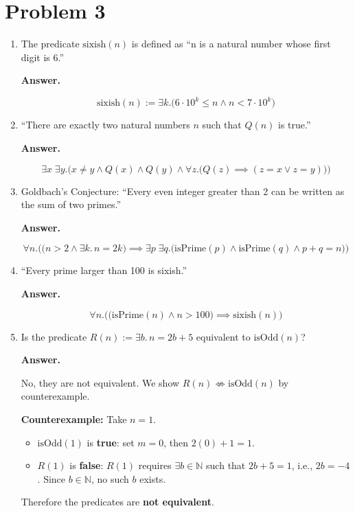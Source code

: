 \documentclass[11pt]{article}
\newcommand{\answer}{
    \vspace{0.5em}
    \noindent\textbf{Answer.}
}
\begin{document}
\section*{Problem 3}

\begin{enumerate}[label=\textbf{(\alph*)}]

\item The predicate $\text{sixish}(n)$ is defined as ``n is a natural number whose first digit is 6.''

\answer
\[
\text{sixish}(n) := \exists k. \Big( 6 \cdot 10^k \leq n \wedge n < 7 \cdot 10^k \Big)
\]

\item ``There are exactly two natural numbers $n$ such that $Q(n)$ is true.''

\answer
\[
\exists x \; \exists y. \Big( x \neq y \wedge Q(x) \wedge Q(y) \wedge \forall z. \big( Q(z) \implies (z = x \vee z = y) \big) \Big)
\]

\item Goldbach's Conjecture: ``Every even integer greater than 2 can be written as the sum of two primes.''

\answer
\[
\forall n. \Big( \big( n > 2 \wedge \exists k.\, n = 2k \big) \implies \exists p \; \exists q. \big( \text{isPrime}(p) \wedge \text{isPrime}(q) \wedge p + q = n \big) \Big)
\]

\item ``Every prime larger than 100 is sixish.''

\answer
\[
\forall n. \Big( \big( \text{isPrime}(n) \wedge n > 100 \big) \implies \text{sixish}(n) \Big)
\]

\item Is the predicate $R(n) := \exists b.\, n = 2b + 5$ equivalent to $\text{isOdd}(n)$?

\answer

No, they are not equivalent. We show $R(n) \not\iff \text{isOdd}(n)$ by counterexample.

\textbf{Counterexample:} Take $n = 1$.
\begin{itemize}
    \item $\text{isOdd}(1)$ is \textbf{true}: set $m = 0$, then $2(0) + 1 = 1$. \checkmark
    \item $R(1)$ is \textbf{false}: $R(1)$ requires $\exists b \in \mathbb{N}$ such that $2b + 5 = 1$,
    i.e., $2b = -4$. Since $b \in \mathbb{N}$, no such $b$ exists.
\end{itemize}

Therefore the predicates are \textbf{not equivalent}.
\end{enumerate}
\end{document}

